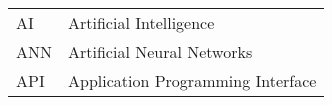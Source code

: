 \begin{longtable}{ l l }
	AI & Artificial Intelligence  \\
	ANN & Artificial Neural Networks  \\
	API & Application Programming Interface  \\
		  
\end{longtable}
